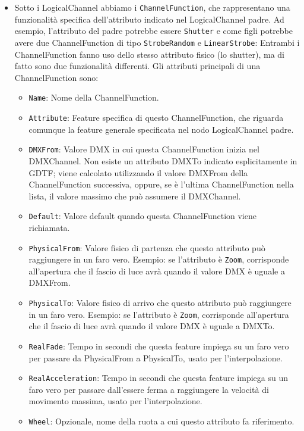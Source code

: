 \documentclass[main.tex]{subfiles}
\begin{document}
\begin{itemize}
\begin{itemize}
        \end{itemize}
    \item Sotto i LogicalChannel abbiamo i \lstinline{ChannelFunction}, che rappresentano una funzionalità specifica dell'attributo indicato nel LogicalChannel padre. Ad esempio, l'attributo del padre potrebbe essere \lstinline{Shutter} e come figli potrebbe avere due ChannelFunction di tipo \lstinline{StrobeRandom} e \lstinline{LinearStrobe}: Entrambi i ChannelFunction fanno uso dello stesso attributo fisico (lo shutter), ma di fatto sono due funzionalità differenti. Gli attributi principali di una ChannelFunction sono: \begin{itemize}
            \item \lstinline{Name}: Nome della ChannelFunction.
            \item \lstinline{Attribute}: Feature specifica di questo ChannelFunction, che riguarda comunque la feature generale specificata nel nodo LogicalChannel padre.
            \item \lstinline{DMXFrom}: Valore DMX in cui questa ChannelFunction inizia nel DMXChannel. Non esiste un attributo DMXTo indicato esplicitamente in GDTF; viene calcolato utilizzando il valore DMXFrom della ChannelFunction successiva, oppure, se è l'ultima ChannelFunction nella lista, il valore massimo che può assumere il DMXChannel.
            \item \lstinline{Default}: Valore default quando questa ChannelFunction viene richiamata.
            \item \lstinline{PhysicalFrom}: Valore fisico di partenza che questo attributo può raggiungere in un faro vero. Esempio: se l'attributo è \lstinline{Zoom}, corrisponde all'apertura che il fascio di luce avrà quando il valore DMX è uguale a DMXFrom.
            \item \lstinline{PhysicalTo}: Valore fisico di arrivo che questo attributo può raggiungere in un faro vero. Esempio: se l'attributo è \lstinline{Zoom}, corrisponde all'apertura che il fascio di luce avrà quando il valore DMX è uguale a DMXTo.
            \item \lstinline{RealFade}: Tempo in secondi che questa feature impiega su un faro vero per passare da PhysicalFrom a PhysicalTo, usato per l'interpolazione.
            \item \lstinline{RealAcceleration}: Tempo in secondi che questa feature impiega su un faro vero per passare dall'essere ferma a raggiungere la velocità di movimento massima, usato per l'interpolazione.
            \item \lstinline{Wheel}: Opzionale, nome della ruota a cui questo attributo fa riferimento.

\end{itemize}
\end{itemize}
\end{document}
